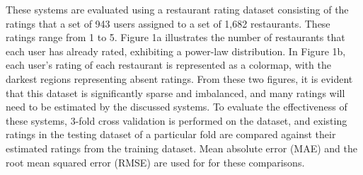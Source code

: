 \documentclass[11pt]{article}
\begin{document}
These systems are evaluated using a restaurant rating dataset consisting of the ratings that a set of 943 users assigned to a set of 1,682 restaurants.
These ratings range from 1 to 5.
Figure 1a illustrates the number of restaurants that each user has already rated, exhibiting a power-law distribution.
In Figure 1b, each user's rating of each restaurant is represented as a colormap, with the darkest regions representing absent ratings.
From these two figures, it is evident that this dataset is significantly sparse and imbalanced, and many ratings will need to be estimated by the discussed systems.
To evaluate the effectiveness of these systems, 3-fold cross validation is performed on the dataset, and existing ratings in the testing dataset of a particular fold are compared against their estimated ratings from the training dataset.
Mean absolute error (MAE) and the root mean squared error (RMSE) are used for for these comparisons.
\end{document}
